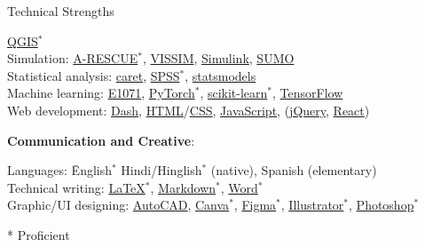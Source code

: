 \documentclass{CV} %
\begin{document}
\begin{rSection}{Technical Strengths}
\begin{spacing}{1.25}
\begin{tabbing}
            \href{https://en.wikipedia.org/wiki/QGIS}{QGIS}$^*$
        \\ Simulation: \>
            \href{https://umnilab.github.io/HSEES_doc/}{A-RESCUE}$^*$,
            \href{https://en.wikipedia.org/wiki/PTV_Vissim}{VISSIM},
            \href{https://en.wikipedia.org/wiki/Simulink}{Simulink},
            \href{https://en.wikipedia.org/wiki/Simulation_of_Urban_MObility}{SUMO}
        \\ Statistical analysis: \>
            \href{https://topepo.github.io/caret/}{caret},
            \href{https://www.ibm.com/products/spss-statistics}{SPSS}$^*$,
            \href{https://www.statsmodels.org/stable/index.html}{statsmodels}
        \\ Machine learning: \>
            \href{https://cran.r-project.org/web/packages/e1071/index.html}{E1071},
            \href{https://en.wikipedia.org/wiki/PyTorch}{PyTorch}$^*$,
            \href{https://en.wikipedia.org/wiki/Scikit-learn}{scikit-learn}$^*$,
            \href{https://en.wikipedia.org/wiki/TensorFlow}{TensorFlow}
        \\ Web development: \>
            \href{https://dash.plotly.com/}{Dash},
            \href{https://en.wikipedia.org/wiki/HTML}{HTML}/\href{https://en.wikipedia.org/wiki/CSS}{CSS},
            \href{https://en.wikipedia.org/wiki/JavaScript}{JavaScript},
            (\href{https://en.wikipedia.org/wiki/JQuery}{jQuery},
            \href{https://en.wikipedia.org/wiki/React_(JavaScript_library)}{React})
    \end{tabbing}
    \end{spacing}
    \textbf{Communication and Creative}:
    \begin{spacing}{1.25}
    \begin{tabbing}
        Languages: \hspace*{2.66cm} \=
            English$^*$
            Hindi/Hinglish$^*$ (native),
            Spanish (elementary)
        \\ Technical writing: \>
            \href{https://en.wikipedia.org/wiki/LaTeX}{LaTeX}$^*$,
            \href{https://en.wikipedia.org/wiki/Markdown}{Markdown}$^*$,
            \href{https://en.wikipedia.org/wiki/Microsoft_Word}{Word}$^*$
        \\ Graphic/UI designing: \>
            \href{https://en.wikipedia.org/wiki/AutoCAD}{AutoCAD},
            \href{https://en.wikipedia.org/wiki/Canva}{Canva}$^*$,
            \href{https://en.wikipedia.org/wiki/Figma}{Figma}$^*$,
            \href{https://en.wikipedia.org/wiki/Adobe_Illustrator}{Illustrator}$^*$,
            \href{https://en.wikipedia.org/wiki/Adobe_Photoshop}{Photoshop}$^*$
    \end{tabbing}
    \end{spacing}
    * Proficient
\end{rSection}
\end{document}
